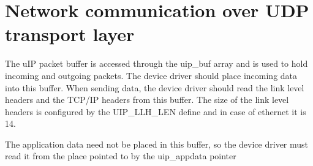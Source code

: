 

\section{Network communication over UDP transport layer}
The uIP packet buffer is accessed through
the uip\_buf array and is used to hold incoming and outgoing packets.
The device driver should place incoming data into this buffer.
When sending data, the device driver should read the link
level headers and the TCP/IP headers from this buffer.
The size of the link level headers is configured by the UIP\_LLH\_LEN
define and in case of ethernet it is 14.

The application data need not be placed in this buffer, so
the device driver must read it from the place pointed to by the
uip\_appdata pointer %
